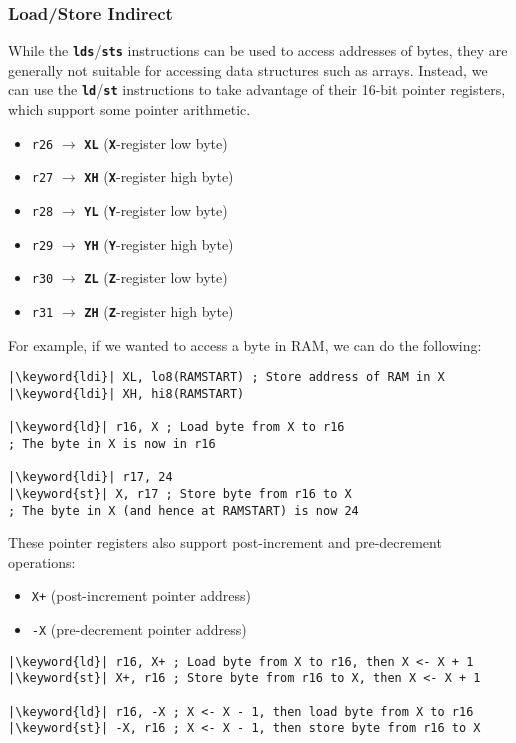 \documentclass{article}
\newcommand{\keyword}[1]{\textcolor[rgb]{0.00,0.50,0.00}{\textbf{#1}}}
\newcommand{\keywordinline}[1]{\textcolor[rgb]{0.00,0.50,0.00}{\textbf{\texttt{#1}}}}
\begin{document}
\subsubsection{Load/Store Indirect}
While the \keywordinline{lds}/\keywordinline{sts} instructions can be
used to access addresses of bytes, they are generally not suitable for
accessing data structures such as arrays. Instead, we can use the
\keywordinline{ld}/\keywordinline{st} instructions to take advantage of
their 16-bit pointer registers, which support some pointer arithmetic.
\begin{itemize}
    \item \texttt{r26} \(\to\) \keywordinline{XL} (\keywordinline{X}-register low byte)
    \item \texttt{r27} \(\to\) \keywordinline{XH} (\keywordinline{X}-register high byte)
    \item \texttt{r28} \(\to\) \keywordinline{YL} (\keywordinline{Y}-register low byte)
    \item \texttt{r29} \(\to\) \keywordinline{YH} (\keywordinline{Y}-register high byte)
    \item \texttt{r30} \(\to\) \keywordinline{ZL} (\keywordinline{Z}-register low byte)
    \item \texttt{r31} \(\to\) \keywordinline{ZH} (\keywordinline{Z}-register high byte)
\end{itemize}
For example, if we wanted to access a byte in RAM, we can do the following:
\begin{verbatim}
|\keyword{ldi}| XL, lo8(RAMSTART) ; Store address of RAM in X
|\keyword{ldi}| XH, hi8(RAMSTART)

|\keyword{ld}| r16, X ; Load byte from X to r16
; The byte in X is now in r16

|\keyword{ldi}| r17, 24
|\keyword{st}| X, r17 ; Store byte from r16 to X
; The byte in X (and hence at RAMSTART) is now 24
\end{verbatim}
These pointer registers also support post-increment and pre-decrement
operations:
\begin{itemize}
    \item \texttt{X+} (post-increment pointer address)
    \item \texttt{-X} (pre-decrement pointer address)
\end{itemize}
\begin{verbatim}
|\keyword{ld}| r16, X+ ; Load byte from X to r16, then X <- X + 1
|\keyword{st}| X+, r16 ; Store byte from r16 to X, then X <- X + 1

|\keyword{ld}| r16, -X ; X <- X - 1, then load byte from X to r16
|\keyword{st}| -X, r16 ; X <- X - 1, then store byte from r16 to X
\end{verbatim}
\end{document}
